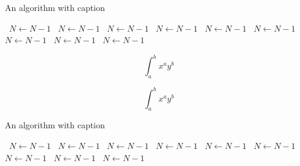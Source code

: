 \documentclass[a4paper]{article}
\begin{document}
\begin{algorithm}
\caption{An algorithm with caption}
\begin{algorithmic}
\    \State $N \gets N - 1$
\    \State $N \gets N - 1$
\    \State $N \gets N - 1$
\    \State $N \gets N - 1$
\    \State $N \gets N - 1$
\    \State $N \gets N - 1$
\    \State $N \gets N - 1$
\    \State $N \gets N - 1$
\    \State $N \gets N - 1$
\EndWhile
\end{algorithmic}
\end{algorithm}

\[ \int_{a}^{b}{x^{a}y^{b}} \]

\[ \int_{a}^{b}{x^{a}y^{b}} \]

\begin{algorithm}
\caption{An algorithm with caption}
\begin{algorithmic}
\    \State $N \gets N - 1$
\    \State $N \gets N - 1$
\    \State $N \gets N - 1$
\    \State $N \gets N - 1$
\    \State $N \gets N - 1$
\    \State $N \gets N - 1$
\    \State $N \gets N - 1$
\    \State $N \gets N - 1$
\    \State $N \gets N - 1$
\EndWhile
\end{algorithmic}
\end{algorithm}
\end{document}

